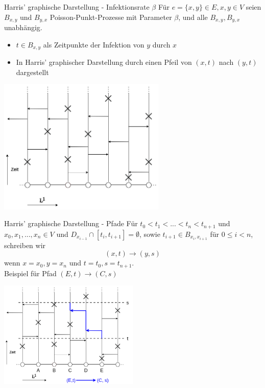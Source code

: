 \documentclass[11pt]{beamer}
\begin{document}
\begin{frame}{Harris' graphische Darstellung - Infektionsrate $\beta$}
    Für $e = \{ x, y \} \in E, x, y \in V$ seien $B_{x, y}$ und $B_{y, x}$ Poisson-Punkt-Prozesse mit Parameter
    $\beta$, und alle $B_{x,y}, B_{y,x}$ unabh\"angig.
    \begin{itemize}
        \item $t \in B_{x, y}$ als Zeitpunkte der Infektion von $y$ durch $x$
        \item In Harris' graphischer Darstellung durch einen Pfeil von $(x, t)$ nach $(y, t)$
        dargestellt
    \end{itemize}
    \begin{center}
        \includegraphics[width = 0.6\textwidth]{images/contact process arrows.png}
    \end{center}
\end{frame}

\begin{frame}{Harris' graphische Darstellung - Pfade}
    Für $t_0 < t_1 < ... < t_n < t_{n + 1}$ und $x_0, x_1, ..., x_n \in V$
    und $D_{x_{i - 1}} \cap [t_i, t_{i + 1}] = \emptyset$, sowie $t_{i + 1} \in B_{x_i, x_{i + 1}}$ für
    $0 \leq i < n$, schreiben wir 
    \begin{equation*}
        (x, t) \to (y, s)
    \end{equation*}
    wenn $x = x_0, y = x_n$ und $t = t_0, s = t_{n + 1}$.
    \\
    Beispiel f\"ur Pfad $(E, t) \to (C, s)$
    \begin{center}
        \includegraphics[width=0.5\textwidth]{images/contact process path.png}
    \end{center}
\end{frame}
\end{document}
